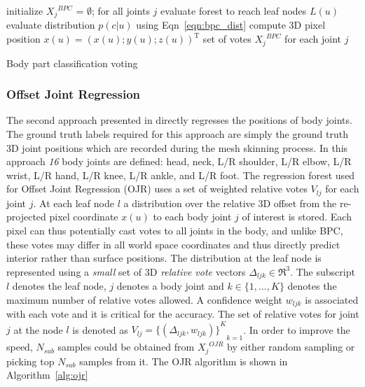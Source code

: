 \begin{algorithm}
 initialize ${X_j}^{BPC}$ = $\emptyset$; for all joints $j$ \;
  { 
   evaluate forest to reach leaf nodes $L(u)$ \;
   evaluate distribution $p(c\vert u)$ using Eqn~\ref{eqn:bpc_dist} \;
   compute 3D pixel position $x(u) = (x(u); y(u); z(u))^\text{T}$ \;
  }
 \Return set of votes ${X_j}^{BPC}$ for each joint $j$ \;
 \caption{Body part classification voting}
 \label{alg:bpc}
\end{algorithm}

\subsubsection{Offset Joint Regression} The second approach presented in \cite{shotton2013efficient} directly regresses the positions of body joints. The ground truth labels required for this approach are simply the ground truth 3D joint positions which are recorded during the mesh skinning process. In this approach \emph{16} body joints are defined: head, neck, L/R shoulder, L/R elbow, L/R wrist, L/R hand, L/R knee, L/R ankle, and L/R foot. The regression forest used for Offset Joint Regression (OJR) uses a set of weighted relative votes $V_{lj}$ for each joint $j$. At each leaf node $l$ a distribution over the relative 3D offset from the re-projected pixel coordinate $x(u)$ to each body joint $j$ of interest is stored. Each pixel can thus potentially cast votes to all joints in the body, and unlike BPC, these votes may differ in all world space coordinates and thus directly predict interior rather than surface positions. The distribution at the leaf node is represented using a \emph{small} set of 3D \emph{relative vote} vectors $\Delta_{ljk} \in \Re^3$. The subscript $l$ denotes the leaf node, $j$ denotes a body joint and $k \in \lbrace 1,...,K \rbrace$ denotes the maximum number of relative votes allowed. A confidence weight $w_{ljk}$ is associated with each vote and it is critical for the accuracy. The set of relative votes for joint $j$ at the node $l$ is denoted as $V_{lj}={{\lbrace (\Delta_{ljk},w_{ljk}) \rbrace}^K}_{k=1}$. In order to improve the speed, $N_{sub}$ samples could be obtained from ${X_j}^{OJR}$ by either random sampling or picking top $N_{sub}$ samples from it. The OJR algorithm is shown in Algorithm~\ref{alg:ojr}

